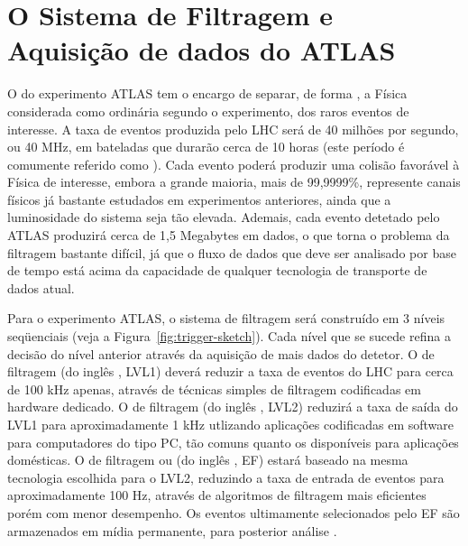 \typeout{ ====================================================================}
\typeout{ ====================================================================}

\chapter{O Sistema de Filtragem e Aquisição de dados do ATLAS}
\label{chap:trigger}

O  do experimento ATLAS tem o encargo de separar, de
forma , a Física considerada como ordinária segundo o experimento,
dos raros eventos de interesse. A taxa de eventos produzida pelo LHC será de
40 milhões por segundo, ou 40 MHz, em bateladas que durarão cerca de 10 horas
(este período é comumente referido como ). Cada evento poderá
produzir uma colisão favorável à Física de interesse, embora a grande maioria,
mais de 99,9999\%, represente canais físicos já bastante estudados em
experimentos anteriores, ainda que a luminosidade do sistema seja tão
elevada. Ademais, cada evento detetado pelo ATLAS produzirá cerca de 1,5
Megabytes em dados, o que torna o problema da filtragem bastante difícil, já
que o fluxo de dados que deve ser analisado por base de tempo está acima da
capacidade de qualquer tecnologia de transporte de dados atual.

Para o experimento ATLAS, o sistema de filtragem será construído em 3 níveis
seqüenciais (veja a Figura~\ref{fig:trigger-sketch}). Cada nível que se sucede
refina a decisão do nível anterior através da aquisição de mais dados do
detetor. O  de filtragem (do inglês , LVL1) deverá reduzir a taxa de eventos do LHC para cerca de 100 kHz
apenas, através de técnicas simples de filtragem codificadas em hardware
dedicado. O  de filtragem (do inglês
, LVL2) reduzirá a taxa de saída do LVL1 para
aproximadamente 1 kHz utlizando aplicações codificadas em software para
computadores do tipo PC, tão comuns quanto os disponíveis para aplicações
domésticas. O  de filtragem ou
 (do inglês , EF) estará baseado
na mesma tecnologia escolhida para o LVL2, reduzindo a taxa de entrada de
eventos para aproximadamente 100 Hz, através de algoritmos de filtragem mais
eficientes porém com menor desempenho. Os eventos ultimamente selecionados
pelo EF são armazenados em mídia permanente, para posterior análise
. 

